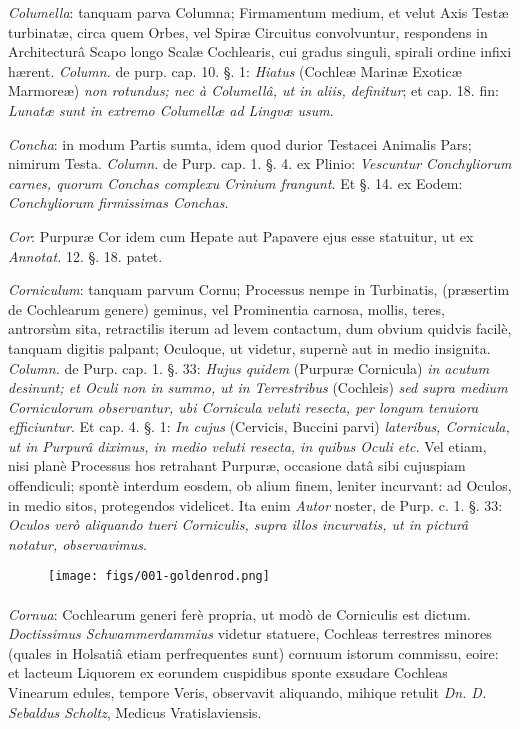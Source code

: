 \documentclass[a4paper, 11pt, oneside, polutonikogreek, german]{article}
\begin{document}
\emph{Columella}: tanquam parva Columna; Firmamentum medium, et velut Axis Testæ turbinatæ, circa quem Orbes, vel Spiræ Circuitus convolvuntur, respondens in Architecturâ Scapo longo Scalæ Cochlearis, cui gradus singuli, spirali ordine infixi hærent. \emph{Column.} de purp. cap. 10. §. 1: \emph{Hiatus} (Cochleæ Marinæ Exoticæ Marmoreæ) \emph{non rotundus; nec à Columellâ, ut in aliis, definitur}; et cap. 18. fin: \emph{Lunatæ sunt in extremo Columellæ ad Lingvæ usum}.

\emph{Concha}: in modum Partis sumta, idem quod durior Testacei Animalis Pars; nimirum Testa. \emph{Column.} de Purp. cap. 1. §. 4. ex Plinio: \emph{Vescuntur Conchyliorum carnes, quorum Conchas complexu Crinium frangunt}. Et §. 14. ex Eodem: \emph{Conchyliorum firmissimas Conchas}.

\emph{Cor}: Purpuræ Cor idem cum Hepate aut Papavere ejus esse statuitur, ut ex \emph{Annotat.} 12. §. 18. patet.

\emph{Corniculum}: tanquam parvum Cornu; Processus nempe in Turbinatis, (præsertim de Cochlearum genere) geminus, vel Prominentia carnosa, mollis, teres, antrorsùm sita, retractilis iterum ad levem contactum, dum obvium quidvis facilè, tanquam digitis palpant; Oculoque, ut videtur, supernè aut in medio insignita. \emph{Column.} de Purp. cap. 1. §. 33: \emph{Hujus quidem} (Purpuræ Cornicula) \emph{in acutum desinunt; et Oculi non in summo, ut in Terrestribus} (Cochleis) \emph{sed supra medium Corniculorum observantur, ubi Cornicula veluti resecta, per longum tenuiora efficiuntur}. Et cap. 4. §. 1: \emph{In cujus} (Cervicis, Buccini parvi) \emph{lateribus, Cornicula, ut in Purpurâ diximus, in medio veluti resecta, in quibus Oculi etc.} Vel etiam, nisi planè Processus hos retrahant Purpuræ, occasione datâ sibi cujuspiam offendiculi; spontè interdum eosdem, ob alium finem, leniter incurvant: ad Oculos, in medio sitos, protegendos videlicet. Ita enim \emph{Autor} noster, de Purp. c. 1. §. 33: \emph{Oculos verò aliquando tueri Corniculis, supra illos incurvatis, ut in picturâ notatur, observavimus}.

\begin{figure}[H]
\centering
\texttt{[image: figs/001-goldenrod.png]}
\end{figure}
\paragraph{}
\emph{Cornua}: Cochlearum generi ferè propria, ut modò de Corniculis est dictum. \emph{Doctissimus Schwammerdammius} videtur statuere, Cochleas terrestres minores (quales in Holsatiâ etiam perfrequentes sunt) cornuum istorum commissu, eoire: et lacteum Liquorem ex eorundem cuspidibus sponte exsudare Cochleas Vinearum edules, tempore Veris, observavit aliquando, mihique retulit \emph{Dn. D. Sebaldus Scholtz}, Medicus Vratislaviensis.
\end{document}
